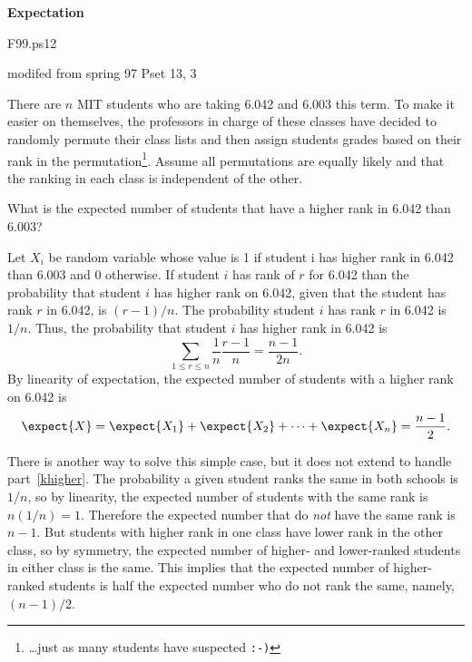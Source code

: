\begin{problem} \textbf{Expectation}

\begin{staffnotes}
F99.ps12

modifed from spring 97 Pset 13, 3
\end{staffnotes}

There are $n$ MIT students who are taking 6.042 and 6.003 this term.  To
make it easier on themselves, the professors in charge of these classes
have decided to randomly permute their class lists and then assign
students grades based on their rank in the permutation\footnote{\dots just
as many students have suspected \texttt{:-)}}.  Assume all permutations
are equally likely and that the ranking in each class is independent of
the other.

\bparts

\ppart
What is the expected number of students that have a higher rank
in 6.042 than 6.003?


\examspace[1.5in]

\begin{solution}
Let $X_i$ be random variable whose value is 1 if student i has higher rank
in 6.042 than 6.003 and 0 otherwise.  If student $i$ has rank of $r$ for
6.042 than the probability that student $i$ has higher rank on 6.042,
given that the student has rank $r$ in 6.042, is $(r-1)/n$.  The
probability student $i$ has rank $r$ in 6.042 is $1/n$.  Thus, the
probability that student $i$ has higher rank in 6.042 is
\[
\sum_{1\leq r \leq n}  \frac{1}{n} \frac{r-1}{n} = \frac{n-1}{2n}.
\]
By linearity of expectation, the expected number of students with a higher
rank on 6.042 is
\[
\expect{X} = \expect{X_1}+\expect{X_2}+ \cdots +\expect{X_n} = \frac{n-1}{2}.
\]

There is another way to solve this simple case, but it does not extend
to handle part~\eqref{khigher}.  The probability a given student ranks
the same in both schools is $1/n$, so by linearity, the expected
number of students with the same rank is $n(1/n)=1$.  Therefore the
expected number that do \emph{not} have the same rank is $n-1$.  But
students with higher rank in one class have lower rank in the other
class, so by symmetry, the expected number of higher- and lower-ranked
students in either class is the same.  This implies that the expected
number of higher-ranked students is half the expected number who do
not rank the same, namely, $(n-1)/2$.
\end{solution}


\end{problem}
